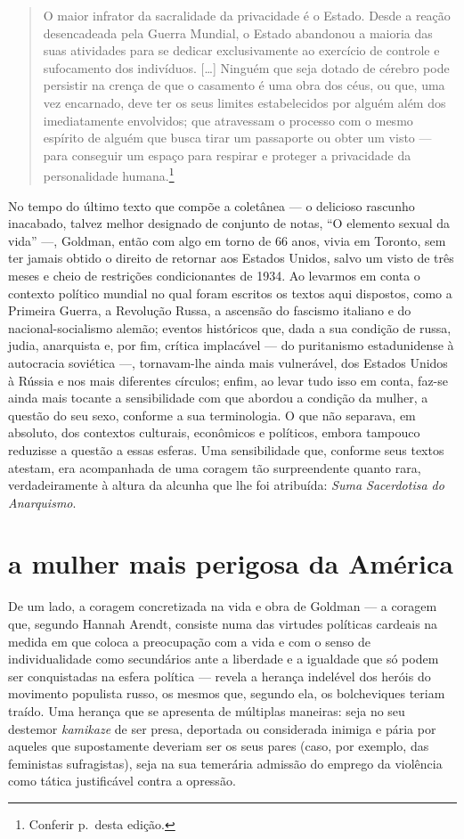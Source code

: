 \begin{quote}
O maior infrator da sacralidade da privacidade é o Estado. Desde a
reação desencadeada pela Guerra Mundial, o Estado abandonou a maioria
das suas atividades para se dedicar exclusivamente ao exercício de
controle e sufocamento dos indivíduos. {[}\ldots{]} Ninguém que seja dotado
de cérebro pode persistir na crença de que o casamento é uma obra dos
céus, ou que, uma vez encarnado, deve ter os seus limites estabelecidos
por alguém além dos imediatamente envolvidos; que atravessam o processo
com o mesmo espírito de alguém que busca tirar um passaporte ou obter um
visto --- para conseguir um espaço para respirar e proteger a privacidade
da personalidade humana.\footnote{Conferir p.\,\pageref{ref3} desta edição.}
\end{quote}

No tempo do último texto que compõe a coletânea --- o delicioso
rascunho inacabado, talvez melhor designado de conjunto de notas,
``O elemento sexual da vida'' ---, Goldman, então com algo em
torno de 66 anos, vivia em Toronto, sem ter jamais obtido o
direito de retornar aos Estados Unidos, salvo um visto de três meses e
cheio de restrições condicionantes de 1934. Ao levarmos em conta o
contexto político mundial no qual foram escritos os textos aqui dispostos,
como a Primeira Guerra, a Revolução Russa, a ascensão do fascismo
italiano e do nacional-socialismo alemão; eventos históricos
que, dada a sua condição de russa, judia, anarquista e, por
fim, crítica implacável --- do puritanismo estadunidense à autocracia
soviética ---, tornavam-lhe ainda mais vulnerável, dos Estados Unidos
à Rússia e nos mais diferentes círculos; enfim, ao levar tudo isso em
conta, faz-se ainda mais tocante a sensibilidade com que abordou a
condição da mulher, a questão do seu sexo, conforme a sua terminologia.
O que não separava, em absoluto, dos contextos culturais, econômicos e
políticos, embora tampouco reduzisse a questão a essas esferas. Uma
sensibilidade que, conforme seus textos atestam, era acompanhada de
uma coragem tão surpreendente quanto rara, verdadeiramente à altura da
alcunha que lhe foi atribuída: \textit{Suma Sacerdotisa do Anarquismo}.

\section{a mulher mais perigosa da América}

De um lado, a coragem concretizada na vida e obra de Goldman --- a
coragem que, segundo Hannah Arendt, consiste numa das virtudes políticas
cardeais na medida em que coloca a preocupação com a vida e com o senso
de individualidade como secundários ante a liberdade e a igualdade que
só podem ser conquistadas na esfera política --- revela a herança
indelével dos heróis do movimento populista russo, os mesmos que,
segundo ela, os bolcheviques teriam traído. Uma herança que se apresenta
de múltiplas maneiras: seja no seu destemor
\textit{kamikaze} de ser presa, deportada ou considerada inimiga e pária por
aqueles que supostamente deveriam ser os seus pares (caso, por exemplo,
das feministas sufragistas), seja na sua temerária admissão do emprego
da violência como tática justificável contra a opressão.

